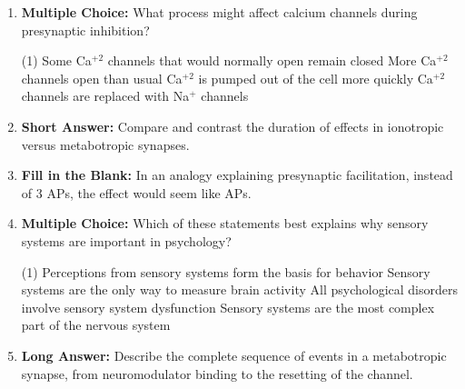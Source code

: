 \begin{enumerate}[label=\textbf{Q2.8.\arabic*}]
      \item \textbf{Multiple Choice:} What process might affect calcium channels during presynaptic inhibition?
            \begin{tasks}[label=(\Alph*), label-width=1.5em, item-indent=1.7em](1)
                  \task Some Ca\(^{+2}\) channels that would normally open remain closed
                  \task More Ca\(^{+2}\) channels open than usual
                  \task Ca\(^{+2}\) is pumped out of the cell more quickly
                  \task Ca\(^{+2}\) channels are replaced with Na\(^{+}\) channels
            \end{tasks}
            
      \item \textbf{Short Answer:} Compare and contrast the duration of effects in ionotropic versus metabotropic synapses. \\
            
      \item \textbf{Fill in the Blank:} In an analogy explaining presynaptic facilitation, instead of 3 APs, the effect would seem like \underline{\hspace{3cm}} APs. \\

\newpage

      \item \textbf{Multiple Choice:} Which of these statements best explains why sensory systems are important in psychology?
            \begin{tasks}[label=(\Alph*), label-width=1.5em, item-indent=1.7em](1)
                  \task Perceptions from sensory systems form the basis for behavior
                  \task Sensory systems are the only way to measure brain activity
                  \task All psychological disorders involve sensory system dysfunction
                  \task Sensory systems are the most complex part of the nervous system
            \end{tasks}
            
      \item \textbf{Long Answer:} Describe the complete sequence of events in a metabotropic synapse, from neuromodulator binding to the resetting of the channel. \\
\end{enumerate}